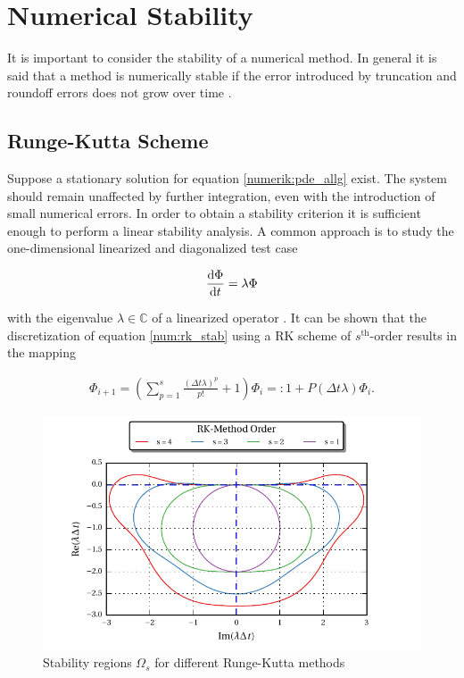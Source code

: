 \section{Numerical Stability}

It is important to consider the stability of a numerical method. In general it is said that a method is numerically stable if the error
introduced by truncation and roundoff errors does not grow over time \citep{ferziger99}.\\

\subsection{Runge-Kutta Scheme}

Suppose  a stationary solution for equation \ref{numerik:pde_allg} exist.
The system should remain unaffected by further integration, even with the introduction of small numerical errors.
In order to obtain a stability criterion it is sufficient enough to perform a linear stability analysis.
A common approach is to study the one-dimensional linearized and diagonalized test case

\begin{align}
\label{num:rk_stab}
\frac{\mathop{}\!\mathrm{d} \Phi}{\mathop{}\!\mathrm{d} t} = \lambda \Phi
\end{align}

with the eigenvalue $\lambda \in \mathbb{C}$ of a linearized operator \citep{Williamson1980}.
It can be shown that the discretization of equation \ref{num:rk_stab} using a RK scheme of $s^{\text{th}}$-order
results in  the mapping \citep{Williamson1980}

\begin{align}
    \Phi_{i+1}  = \left(\sum_{p=1}^s \frac{(\Delta t \lambda)^p}{p!}  + 1 \right) \Phi_i =: 1 + P(\Delta t\lambda)\Phi_i.
\end{align}

\begin{figure}[!tp]
  \begin{minipage}[c]{0.6\textwidth}
      \includegraphics{gfx/numerik/rk_stability.pdf}
  \end{minipage}\hfill
  \begin{minipage}[c]{0.3\textwidth}
  \caption{Stability regions $\Omega_s$ for different Runge-Kutta methods}
  \label{fig:num_rkstab}
  \end{minipage}
\end{figure}

